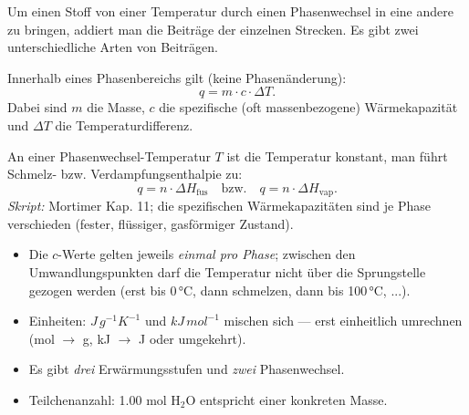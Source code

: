 

Um einen Stoff von einer Temperatur durch einen Phasenwechsel in eine andere
zu bringen, addiert man die Beiträge der einzelnen Strecken. Es gibt zwei
unterschiedliche Arten von Beiträgen.

\begin{werkzeugkasten}
Innerhalb eines Phasenbereichs gilt (keine Phasenänderung):
\[
  q = m \cdot c \cdot \Delta T .
\]
Dabei sind $m$ die Masse, $c$ die spezifische (oft massenbezogene)
Wärmekapazität und $\Delta T$ die Temperaturdifferenz.

An einer Phasenwechsel-Temperatur $T$ ist die Temperatur konstant, man
führt Schmelz- bzw. Verdampfungsenthalpie zu:
\[
  q = n \cdot \Delta H_{\text{fus}}\quad\text{bzw.}\quad
  q = n \cdot \Delta H_{\text{vap}} .
\]
\textit{Skript:} Mortimer Kap. 11; die spezifischen Wärmekapazitäten sind
je Phase verschieden (fester, flüssiger, gasförmiger Zustand).
\end{werkzeugkasten}

\begin{achtung}
\begin{itemize}
  \item Die $c$-Werte gelten jeweils \emph{einmal pro Phase}; zwischen den
        Umwandlungspunkten darf die Temperatur nicht über die Sprungstelle
        gezogen werden (erst bis 0\,°C, dann schmelzen, dann bis 100\,°C, ...).
  \item Einheiten: $J\,g^{-1}K^{-1}$ und $kJ\,mol^{-1}$ mischen sich --- erst
        einheitlich umrechnen (mol $\rightarrow$ g, kJ $\rightarrow$ J oder umgekehrt).
  \item Es gibt \emph{drei} Erwärmungsstufen und \emph{zwei} Phasenwechsel.
  \item Teilchenanzahl: 1.00 mol H$_2$O entspricht einer konkreten Masse.
\end{itemize}
\end{achtung}
